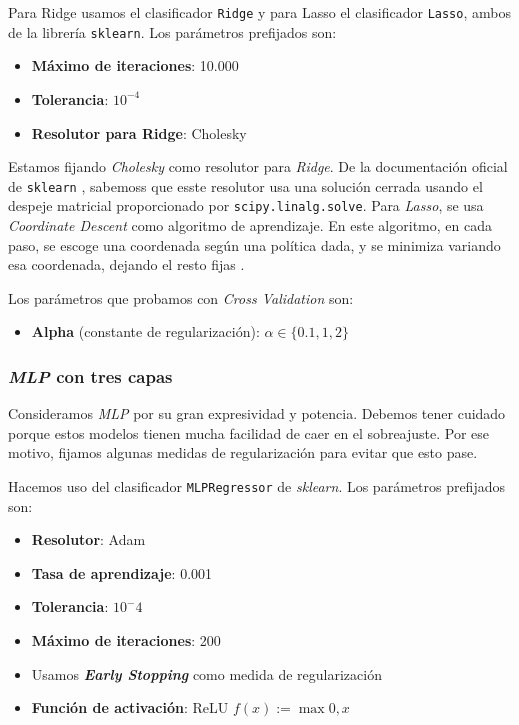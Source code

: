 \documentclass[11pt]{article}
\begin{document}
Para Ridge usamos el clasificador \lstinline{Ridge} y para Lasso el clasificador \lstinline{Lasso}, ambos de la librería \lstinline{sklearn}. Los parámetros prefijados son:

\begin{itemize}
  \item \textbf{Máximo de iteraciones}: 10.000
  \item \textbf{Tolerancia}: $10^{-4}$
  \item \textbf{Resolutor para Ridge}: Cholesky
\end{itemize}

Estamos fijando \emph{Cholesky} como resolutor para \emph{Ridge}. De la documentación oficial de \lstinline{sklearn} \cite{sk_linear:online}, sabemoss que  esste resolutor usa una solución cerrada usando el despeje matricial proporcionado por \lstinline{scipy.linalg.solve}. Para \emph{Lasso}, se usa \emph{Coordinate Descent} como algoritmo de aprendizaje. En este algoritmo, en cada paso, se escoge una coordenada según una política dada, y se minimiza variando esa coordenada, dejando el resto fijas \cite{coordinate_descent:online}.

Los parámetros que probamos con \emph{Cross Validation} son:

\begin{itemize}
  \item \textbf{Alpha} (constante de regularización): $\alpha \in \{0.1, 1, 2\}$
\end{itemize}

\subsubsection{\emph{MLP} con tres capas} \label{mlp}

Consideramos \emph{MLP} por su gran expresividad y potencia. Debemos tener cuidado porque estos modelos tienen mucha facilidad de caer en el sobreajuste. Por ese motivo, fijamos algunas medidas de regularización para evitar que esto pase.

Hacemos uso del clasificador \lstinline{MLPRegressor} de \emph{sklearn}. Los parámetros prefijados son:

\begin{itemize}
  \item \textbf{Resolutor}: Adam
  \item \textbf{Tasa de aprendizaje}: 0.001
  \item \textbf{Tolerancia}: $10^-4$
  \item \textbf{Máximo de iteraciones}: 200
  \item Usamos \textbf{\emph{Early Stopping}} como medida de regularización
  \item \textbf{Función de activación}: ReLU $f(x) := \max{0,x}$
\end{itemize}
\end{document}
